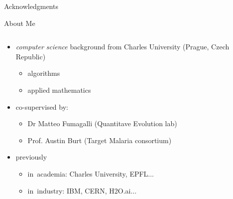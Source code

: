 \documentclass[final,hyperref={pdfpagelabels=false}]{beamer}
\begin{document}
\begin{frame}[t]
\begin{columns}[t]
\begin{column}{.465\textwidth}
\begin{block}{Acknowledgments}
\end{block}



\begin{block}{About Me}

\begin{columns} %

\begin{column}{.65\textwidth} %
\begin{itemize}
\item \emph{computer science} background from Charles University (Prague, Czech Republic)
    \begin{itemize}
    \item algorithms
    \item applied mathematics
    \end{itemize}
    
\item co-supervised by:
    \begin{itemize}
	\item Dr Matteo Fumagalli (Quantitave Evolution lab)
	\item Prof. Austin Burt (Target Malaria consortium)
    \end{itemize}
    
\item previously
    \begin{itemize}
	\item in~academia: Charles University, EPFL$\dots$
	\item in~industry: IBM, CERN, H2O.ai$\dots$
    \end{itemize}
\end{itemize}
\end{column}


\end{columns}
\end{block}
\end{column}
\end{columns}
\end{frame}
\end{document}
